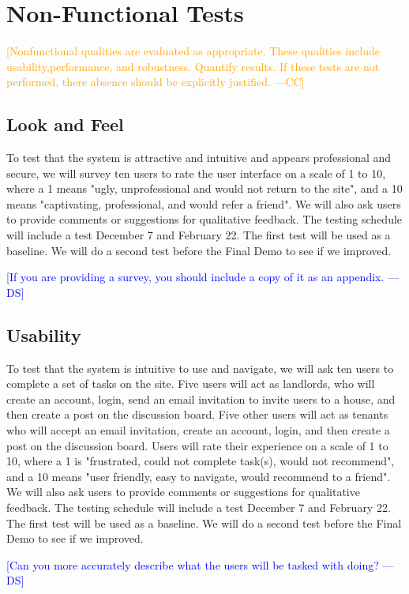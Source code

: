 \documentclass[12pt]{article}
\newcommand{\authornote}[3]{\textcolor{#1}{[#3 ---#2]}}
\newcommand{\authornote}[3]{}
\newcommand{\ds}[1]{\authornote{blue}{DS}{#1}}
\newcommand{\cc}[1]{\authornote{orange}{CC}{#1}}
\begin{document}
\section{Non-Functional Tests}
\cc{Nonfunctional qualities are evaluated as appropriate.  These qualities include usability,performance, and robustness.  Quantify results. If these tests are not performed, there absence should be explicitly justified.}

\subsection{Look and Feel}
To test that the system is attractive and intuitive and appears professional and secure, we will survey ten users to rate the user interface on a scale of 1 to 10, where a 1 means "ugly, unprofessional and would not return to the site", and a 10 means "captivating, professional, and would refer a friend". We will also ask users to provide comments or suggestions for qualitative feedback. The testing schedule will include a test December 7 and February 22. The first test will be used as a baseline. We will do a second test before the Final Demo to see if we improved.

\ds{If you are providing a survey, you should include a copy of it as an appendix.}

\subsection{Usability}
To test that the system is intuitive to use and navigate, we will ask ten users to complete a set of tasks on the site. Five users will act as landlords, who will create an account, login, send an email invitation to invite users to a house, and then create a post on the discussion board. Five other users will act as tenants who will accept an email invitation, create an account, login, and then create a post on the discussion board. Users will rate their experience on a scale of 1 to 10, where a 1 is "frustrated, could not complete task(s), would not recommend", and a 10 means "user friendly, easy to navigate, would recommend to a friend".  We will also ask users to provide comments or suggestions for qualitative feedback. The testing schedule will include a test December 7 and February 22. The first test will be used as a baseline. We will do a second test before the Final Demo to see if we improved.

\ds{Can you more accurately describe what the users will be tasked with doing?}
\end{document}
